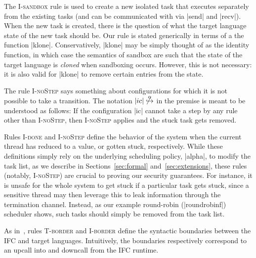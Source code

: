 The \textsc{I-sandbox} rule is used to create a new isolated task that
executes separately from the existing tasks (and can be communicated
with via |send| and |recv|).  When the new task is created, there
is the question of what the target language state of the new task should
be.  Our rule is stated generically in terms of a the function |klone|.
Conservatively, |klone| may be simply thought of as the identity
function, in which
case the semantics of sandbox are such that the state of the target language is \emph{cloned}
when sandboxing occurs.  However, this is not necessary: it is also valid for |klone|
to remove certain entries from the state.

The rule \textsc{I-noStep} says something about configurations for which
it is not possible to take a transition.  The notation
$|ic|\not\overset{\alpha}{\hookrightarrow}$ in the premise
is meant to be understood as
follows:  If the configuration |ic| cannot take a step by any rule other
than \textsc{I-noStep}, then \textsc{I-noStep} applies and the
stuck task gets removed.

Rules \textsc{I-done} and \textsc{I-noStep} define the behavior of the system
when the current thread has reduced to a value, or gotten stuck, respectively.
%
While these definitions simply rely on the underlying scheduling policy,
|alpha|, to modify the task list, as we describe in Sections~\ref{sec:formal}
and~\ref{sec:extensions}, these rules (notably, \textsc{I-noStep}) are crucial
to proving our security guarantees.
%
For instance, it is unsafe for the whole system to get stuck if a particular
task gets stuck, since a sensitive thread may then leverage this to leak
information through the termination channel.
%
Instead, as our example round-robin (|roundrobinf|) scheduler shows,
such tasks should simply be removed from the task list.

%
As in~\cite{Matthews:2007:OSM:1190216.1190220}, rules \textsc{T-border} and
\textsc{I-border} define the syntactic boundaries between the IFC and target
languages.
%
Intuitively, the boundaries respectively correspond to an upcall into and
downcall from the IFC runtime.
%

